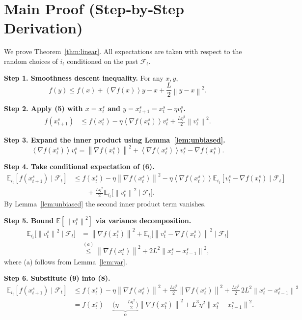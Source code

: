\documentclass[11pt]{article}
\newcommand{\E}{\mathbb{E}}
\newcommand{\norm}[1]{\left\|#1\right\|}
\newcommand{\inner}[1]{\left\langle #1 \right\rangle}
\newcommand{\grad}{\nabla}
\begin{document}
\section*{Main Proof (Step‑by‑Step Derivation)}
We prove Theorem~\ref{thm:linear}.  All expectations are taken with respect to the random choices of $i_t$ conditioned on the past $\mathcal{F}_{t}$.

\noindent\textbf{Step 1. Smoothness descent inequality.}  
For any $x,y$,
\[
f(y)\le f(x)+\inner{\grad f(x)}{y-x}+\frac{L}{2}\norm{y-x}^{2}.
\tag{5}
\]  

\noindent\textbf{Step 2. Apply (5) with $x=x_{t}^{s}$ and $y=x_{t+1}^{s}=x_{t}^{s}-\eta v_{t}^{s}$.}  
\[
\begin{aligned}
f(x_{t+1}^{s})
&\le f(x_{t}^{s})-\eta\inner{\grad f(x_{t}^{s})}{v_{t}^{s}}+\frac{L\eta^{2}}{2}\norm{v_{t}^{s}}^{2}.
\tag{6}
\end{aligned}
\]  

\noindent\textbf{Step 3. Expand the inner product using Lemma~\ref{lem:unbiased}.}  
\[
\inner{\grad f(x_{t}^{s})}{v_{t}^{s}}
= \norm{\grad f(x_{t}^{s})}^{2}
+\inner{\grad f(x_{t}^{s})}{v_{t}^{s}-\grad f(x_{t}^{s})}.
\tag{7}
\]  

\noindent\textbf{Step 4. Take conditional expectation of (6).}  
\[
\begin{aligned}
\E_{i_t}[f(x_{t+1}^{s})\mid\mathcal{F}_{t}]
&\le f(x_{t}^{s})-\eta\norm{\grad f(x_{t}^{s})}^{2}
-\eta\inner{\grad f(x_{t}^{s})}{\E_{i_t}[v_{t}^{s}-\grad f(x_{t}^{s})\mid\mathcal{F}_{t}]}\\
&\qquad+\frac{L\eta^{2}}{2}\E_{i_t}\!\bigl[\norm{v_{t}^{s}}^{2}\mid\mathcal{F}_{t}\bigr].
\end{aligned}
\tag{8}
\]  
By Lemma~\ref{lem:unbiased} the second inner product term vanishes.

\noindent\textbf{Step 5. Bound $\E[\norm{v_{t}^{s}}^{2}]$ via variance decomposition.}  
\[
\begin{aligned}
\E_{i_t}\!\bigl[\norm{v_{t}^{s}}^{2}\mid\mathcal{F}_{t}\bigr]
&= \norm{\grad f(x_{t}^{s})}^{2}
+\E_{i_t}\!\bigl[\norm{v_{t}^{s}-\grad f(x_{t}^{s})}^{2}\mid\mathcal{F}_{t}\bigr] \\
&\stackrel{(a)}{\le} \norm{\grad f(x_{t}^{s})}^{2}+2L^{2}\norm{x_{t}^{s}-x_{t-1}^{s}}^{2},
\end{aligned}
\tag{9}
\]  
where (a) follows from Lemma~\ref{lem:var}.

\noindent\textbf{Step 6. Substitute (9) into (8).}  
\[
\begin{aligned}
\E_{i_t}[f(x_{t+1}^{s})\mid\mathcal{F}_{t}]
&\le f(x_{t}^{s})-\eta\norm{\grad f(x_{t}^{s})}^{2}
+\frac{L\eta^{2}}{2}\norm{\grad f(x_{t}^{s})}^{2}
+\frac{L\eta^{2}}{2}\,2L^{2}\norm{x_{t}^{s}-x_{t-1}^{s}}^{2}\\
&= f(x_{t}^{s})-\underbrace{\bigl(\eta-\tfrac{L\eta^{2}}{2}\bigr)}_{\displaystyle \alpha}\norm{\grad f(x_{t}^{s})}^{2}
+L^{3}\eta^{2}\norm{x_{t}^{s}-x_{t-1}^{s}}^{2}.
\end{aligned}
\tag{10}
\]  
\end{document}
